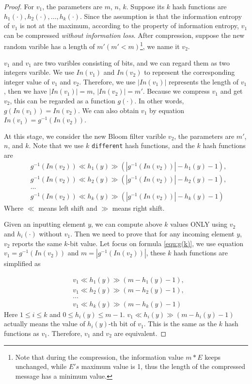 \begin{proof}
For $v_1$, the parameters are $m$, $n$, $k$. Suppose its $k$ hash functions are $h_1(\cdot), h_2(\cdot), \ldots, h_k(\cdot)$. 
Since the assumption is that the information entropy of $v_1$ is not at the maximum, according to the property of information entropy, $v_1$ can be compressed \textit{without information loss}. After compression, suppose the new random varible has a length of $m' (m' < m)$\footnote{Note that during the compression, the information value $m*E$ keeps unchanged, while $E's$ maximum value is 1, thus the length of the compressed message has a minimum value.}, we name it $v_2$.

$v_1$ and $v_1$ are two varibles consisting of bits, and we can regard them as two integers varible. We use $In(v_1)$ and  $In(v_2)$ to represent the corresponding integer value of $v_1$ and $v_2$.
Therefore, we use $|In(v_1)|$ represents the length of $v_1$, then we have  $|In(v_1)|=m$, $|In(v_2)|=m'$.
Because we compress $v_1$ and get $v_2$, this can be regarded as a function $g(\cdot)$. In other words, $g(In(v_1))=In(v_2)$. We can also obtain $v_1$ by equation $In(v_1)=g^{-1}(In(v_2))$.

At this stage, we consider the new Bloom filter varible $v_2$, the parameters are $m'$, $n$, and $k$. Note that we use $k$ \texttt{different} hash functions, and the $k$ hash functions are
\begin{equation}
\begin{aligned}
&g^{-1}(In(v_2))\ll h_1(y) \gg (|g^{-1}(In(v_2))|-h_1(y)-1), \\
&g^{-1}(In(v_2))\ll h_2(y) \gg (|g^{-1}(In(v_2))|-h_2(y)-1), \\
& \ldots \\
&g^{-1}(In(v_2))\ll h_k(y) \gg (|g^{-1}(In(v_2))|-h_k(y)-1)
\end{aligned}
\label{equ:g(k)}
\end{equation}
Where $\ll$ means left shift and $\gg$ means right shift.

Given an inputting element $y$, we can compute above $k$ values ONLY using $v_2$ and $h_i(\cdot)$ without $v_1$.
Then we need to prove that for any incoming element $y$, $v_2$ reports the same $k$-bit value.
Let focus on formula \ref{equ:g(k)}, we use equation $v_1=g^{-1}(In(v_2))$ and $m=|g^{-1}(In(v_2))|$, these $k$ hash functions are simplified as

\begin{equation}
\begin{aligned}
&v_1\ll h_1(y) \gg (m-h_1(y)-1), \\
&v_1\ll h_2(y) \gg (m-h_2(y)-1), \\
& \ldots \\
&v_1\ll h_k(y) \gg (m-h_k(y)-1)
\end{aligned}
\label{equ:g(k):simple}
\end{equation}
Here $1\leqslant i\leqslant k$ and $0\leqslant h_i(y)\leqslant m-1$. 
 $v_1\ll h_i(y) \gg (m-h_i(y)-1)$ actually means the value of $h_i(y)$-th bit of $v_1$. 
This is the same as the $k$ hash functions as $v_1$. Therefore, $v_1$ and $v_2$ are equivalent.
\end{proof}

